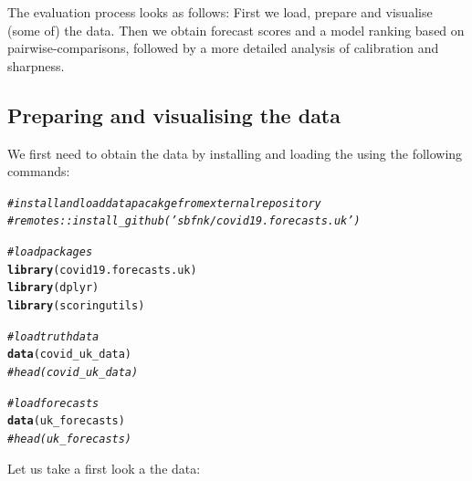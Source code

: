 \documentclass[article,shortnames]{jss}\usepackage[]{graphicx}\usepackage[]{color}
\makeatletter
\newcommand{\hlcom}[1]{\textcolor[rgb]{0.678,0.584,0.686}{\textit{#1}}}%
\newcommand{\hlstd}[1]{\textcolor[rgb]{0.345,0.345,0.345}{#1}}%
\newcommand{\hlkwd}[1]{\textcolor[rgb]{0.737,0.353,0.396}{\textbf{#1}}}%
\newenvironment{kframe}{%
 \def\at@end@of@kframe{}%
 \ifinner\ifhmode%
  \def\at@end@of@kframe{\end{minipage}}%
  \begin{minipage}{\columnwidth}%
 \fi\fi%
 \def\FrameCommand##1{\hskip\@totalleftmargin \hskip-\fboxsep
 \colorbox{shadecolor}{##1}\hskip-\fboxsep
     \hskip-\linewidth \hskip-\@totalleftmargin \hskip\columnwidth}%
 \MakeFramed {\advance\hsize-\width
   \@totalleftmargin\z@ \linewidth\hsize
   \@setminipage}}%
 {\par\unskip\endMakeFramed%
 \at@end@of@kframe}
\newenvironment{knitrout}{}{} %
\makeatother
\begin{document}
The evaluation process looks as follows: First we load, prepare and visualise (some of) the data. Then we obtain forecast scores and a model ranking based on pairwise-comparisons, followed by a more detailed analysis of calibration and sharpness. 

\subsection{Preparing and visualising the data}

We first need to obtain the data by installing and loading the  using the following commands: 
% 
\begin{knitrout}
\color{fgcolor}\begin{kframe}
\begin{alltt}
\hlcom{# install and load data pacakge from external repository}
\hlcom{# remotes::install_github('sbfnk/covid19.forecasts.uk')}

\hlcom{# load packages}
\hlkwd{library}\hlstd{(covid19.forecasts.uk)}
\hlkwd{library}\hlstd{(dplyr)}
\hlkwd{library}\hlstd{(scoringutils)}

\hlcom{# load truth data}
\hlkwd{data}\hlstd{(covid_uk_data)}
\hlcom{# head(covid_uk_data)}

\hlcom{# load forecasts}
\hlkwd{data}\hlstd{(uk_forecasts)}
\hlcom{# head(uk_forecasts)}
\end{alltt}
\end{kframe}
\end{knitrout}
% 
Let us take a first look a the data:
% 
\end{document}
